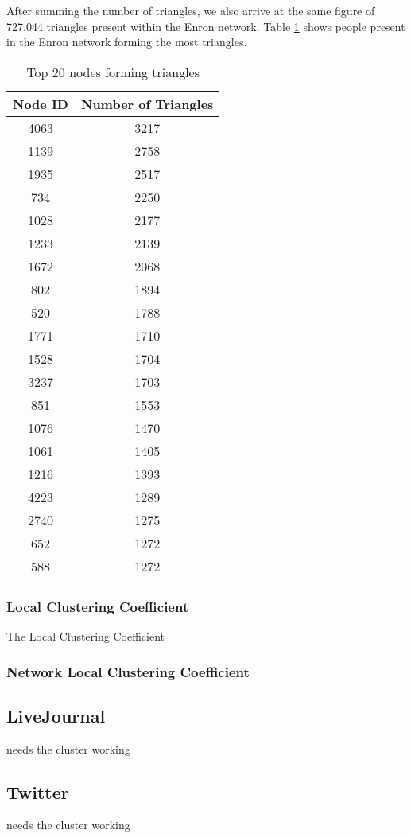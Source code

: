 After summing the number of triangles, we also arrive at the same figure of 727,044 triangles present within the Enron network. Table \ref{tab:enrontriangles} shows people present in the Enron network forming the most triangles.


\begin{table}%
\centering
\begin{tabular}{|c|c|}
\hline
Node ID & Number of Triangles \\
\hline
4063 & 3217 \\
1139 & 2758 \\
1935 & 2517 \\
734 & 2250 \\
1028 & 2177 \\
1233 & 2139 \\
1672 & 2068 \\
802 & 1894 \\
520 & 1788 \\
1771 & 1710 \\
1528 & 1704 \\
3237 & 1703 \\
851 & 1553 \\
1076 & 1470 \\
1061 & 1405 \\
1216 & 1393 \\
4223 & 1289 \\
2740 & 1275 \\
652 & 1272 \\
588 & 1272 \\
\hline
\end{tabular}
\caption{Top 20 nodes forming triangles}
\label{tab:enrontriangles}
\end{table}

\subsubsection{Local Clustering Coefficient}
The Local Clustering Coefficient

\subsubsection{Network Local Clustering Coefficient}

\subsection{LiveJournal}
needs the cluster working

\subsection{Twitter}
needs the cluster working